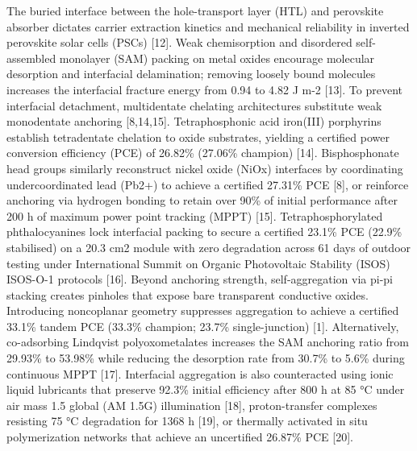 \documentclass[
  11pt,
]{article}
\begin{document}
The buried interface between the hole-transport layer (HTL) and
perovskite absorber dictates carrier extraction kinetics and mechanical
reliability in inverted perovskite solar cells (PSCs) {[}12{]}. Weak
chemisorption and disordered self-assembled monolayer (SAM) packing on
metal oxides encourage molecular desorption and interfacial
delamination; removing loosely bound molecules increases the interfacial
fracture energy from 0.94 to 4.82 J m-2 {[}13{]}. To prevent interfacial
detachment, multidentate chelating architectures substitute weak
monodentate anchoring {[}8,14,15{]}. Tetraphosphonic acid iron(III)
porphyrins establish tetradentate chelation to oxide substrates,
yielding a certified power conversion efficiency (PCE) of 26.82\%
(27.06\% champion) {[}14{]}. Bisphosphonate head groups similarly
reconstruct nickel oxide (NiOx) interfaces by coordinating
undercoordinated lead (Pb2+) to achieve a certified 27.31\% PCE {[}8{]},
or reinforce anchoring via hydrogen bonding to retain over 90\% of
initial performance after 200 h of maximum power point tracking (MPPT)
{[}15{]}. Tetraphosphorylated phthalocyanines lock interfacial packing
to secure a certified 23.1\% PCE (22.9\% stabilised) on a 20.3 cm2
module with zero degradation across 61 days of outdoor testing under
International Summit on Organic Photovoltaic Stability (ISOS) ISOS-O-1
protocols {[}16{]}. Beyond anchoring strength, self-aggregation via
pi-pi stacking creates pinholes that expose bare transparent conductive
oxides. Introducing noncoplanar geometry suppresses aggregation to
achieve a certified 33.1\% tandem PCE (33.3\% champion; 23.7\%
single-junction) {[}1{]}. Alternatively, co-adsorbing Lindqvist
polyoxometalates increases the SAM anchoring ratio from 29.93\% to
53.98\% while reducing the desorption rate from 30.7\% to 5.6\% during
continuous MPPT {[}17{]}. Interfacial aggregation is also counteracted
using ionic liquid lubricants that preserve 92.3\% initial efficiency
after 800 h at 85 °C under air mass 1.5 global (AM 1.5G) illumination
{[}18{]}, proton-transfer complexes resisting 75 °C degradation for 1368
h {[}19{]}, or thermally activated in situ polymerization networks that
achieve an uncertified 26.87\% PCE {[}20{]}.
\end{document}
